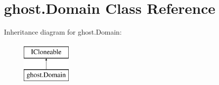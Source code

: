 \hypertarget{classghost_1_1Domain}{\section{ghost.\-Domain Class Reference}
\label{classghost_1_1Domain}
}
Inheritance diagram for ghost.\-Domain\-:\begin{figure}[H]
\begin{center}
\leavevmode
\includegraphics[height=2.000000cm]{classghost_1_1Domain}
\end{center}
\end{figure}
